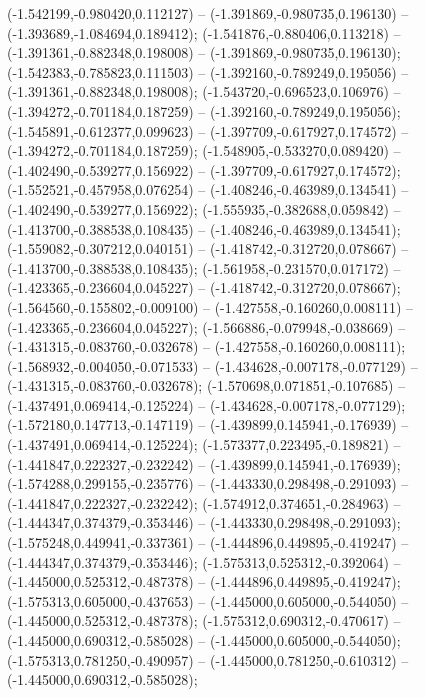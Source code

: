  (-1.542199,-0.980420,0.112127) -- (-1.391869,-0.980735,0.196130) -- (-1.393689,-1.084694,0.189412);
 (-1.541876,-0.880406,0.113218) -- (-1.391361,-0.882348,0.198008) -- (-1.391869,-0.980735,0.196130);
 (-1.542383,-0.785823,0.111503) -- (-1.392160,-0.789249,0.195056) -- (-1.391361,-0.882348,0.198008);
 (-1.543720,-0.696523,0.106976) -- (-1.394272,-0.701184,0.187259) -- (-1.392160,-0.789249,0.195056);
 (-1.545891,-0.612377,0.099623) -- (-1.397709,-0.617927,0.174572) -- (-1.394272,-0.701184,0.187259);
 (-1.548905,-0.533270,0.089420) -- (-1.402490,-0.539277,0.156922) -- (-1.397709,-0.617927,0.174572);
 (-1.552521,-0.457958,0.076254) -- (-1.408246,-0.463989,0.134541) -- (-1.402490,-0.539277,0.156922);
 (-1.555935,-0.382688,0.059842) -- (-1.413700,-0.388538,0.108435) -- (-1.408246,-0.463989,0.134541);
 (-1.559082,-0.307212,0.040151) -- (-1.418742,-0.312720,0.078667) -- (-1.413700,-0.388538,0.108435);
 (-1.561958,-0.231570,0.017172) -- (-1.423365,-0.236604,0.045227) -- (-1.418742,-0.312720,0.078667);
 (-1.564560,-0.155802,-0.009100) -- (-1.427558,-0.160260,0.008111) -- (-1.423365,-0.236604,0.045227);
 (-1.566886,-0.079948,-0.038669) -- (-1.431315,-0.083760,-0.032678) -- (-1.427558,-0.160260,0.008111);
 (-1.568932,-0.004050,-0.071533) -- (-1.434628,-0.007178,-0.077129) -- (-1.431315,-0.083760,-0.032678);
 (-1.570698,0.071851,-0.107685) -- (-1.437491,0.069414,-0.125224) -- (-1.434628,-0.007178,-0.077129);
 (-1.572180,0.147713,-0.147119) -- (-1.439899,0.145941,-0.176939) -- (-1.437491,0.069414,-0.125224);
 (-1.573377,0.223495,-0.189821) -- (-1.441847,0.222327,-0.232242) -- (-1.439899,0.145941,-0.176939);
 (-1.574288,0.299155,-0.235776) -- (-1.443330,0.298498,-0.291093) -- (-1.441847,0.222327,-0.232242);
 (-1.574912,0.374651,-0.284963) -- (-1.444347,0.374379,-0.353446) -- (-1.443330,0.298498,-0.291093);
 (-1.575248,0.449941,-0.337361) -- (-1.444896,0.449895,-0.419247) -- (-1.444347,0.374379,-0.353446);
 (-1.575313,0.525312,-0.392064) -- (-1.445000,0.525312,-0.487378) -- (-1.444896,0.449895,-0.419247);
 (-1.575313,0.605000,-0.437653) -- (-1.445000,0.605000,-0.544050) -- (-1.445000,0.525312,-0.487378);
 (-1.575312,0.690312,-0.470617) -- (-1.445000,0.690312,-0.585028) -- (-1.445000,0.605000,-0.544050);
 (-1.575313,0.781250,-0.490957) -- (-1.445000,0.781250,-0.610312) -- (-1.445000,0.690312,-0.585028);
